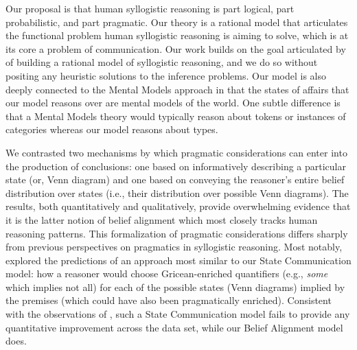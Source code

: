 \documentclass[floatsintext, man]{apa6}
\begin{document}
Our proposal is that human syllogistic reasoning is part logical, part probabilistic, and part pragmatic. Our theory is a rational model that articulates the functional problem human syllogistic reasoning is aiming to solve, which is at its core a problem of communication. Our work builds on the goal articulated by  of building a rational model of syllogistic reasoning, and we do so without positing any heuristic solutions to the inference problems. Our model is also deeply connected to the Mental Models approach \cite{johnson1975models, johnson2015logic} in that the states of affairs that our model reasons over are mental models of the world. 
One subtle difference is that a Mental Models theory would typically reason about tokens or instances of categories whereas our model reasons about types. 

We contrasted two mechanisms by which pragmatic considerations can enter into the production of conclusions: one based on informatively describing a particular state (or, Venn diagram) and one based on conveying the reasoner's entire belief distribution over states (i.e., their distribution over possible Venn diagrams). 
The results, both quantitatively and qualitatively, provide overwhelming evidence that it is the latter notion of belief alignment which most closely tracks human reasoning patterns. 
This formalization of pragmatic considerations differs sharply from previous perspectives on pragmatics in syllogistic reasoning.
Most notably,  explored the predictions of an approach most similar to our State Communication model: how a reasoner would choose Gricean-enriched quantifiers (e.g., \emph{some} which implies not all) for each of the possible states (Venn diagrams) implied by the premises (which could have also been pragmatically enriched). 
Consistent with the observations of , such a State Communication model fails to provide any quantitative improvement across the data set, while our Belief Alignment model does.
\end{document}

